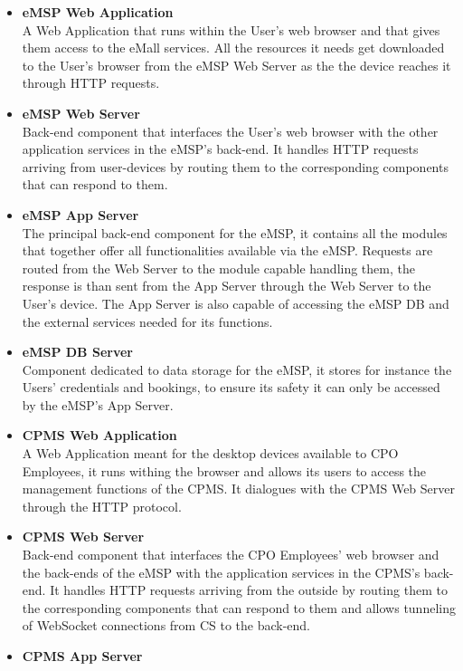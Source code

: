 \documentclass[11pt]{article}
\begin{document}
\begin{itemize}
    \item \textbf{eMSP Web Application} \\
        A Web Application that runs within the User’s web browser and that gives them access to the eMall services. All the resources it needs get downloaded to the User's browser from the eMSP Web Server as the the device reaches it through HTTP requests.

    \newpage

    \item \textbf{eMSP Web Server} \\
        Back-end component that interfaces the User's web browser with the other application services in the eMSP's back-end. It handles HTTP requests arriving from user-devices by routing them to the corresponding components that can respond to them.
    \item \textbf{eMSP App Server} \\
        The principal back-end component for the eMSP, it contains all the modules that together offer all functionalities available via the eMSP. Requests are routed from the Web Server to the module capable handling them, the response is than sent from the App Server through the Web Server to the User's device. The App Server is also capable of accessing the eMSP DB and the external services needed for its functions.
    \item \textbf{eMSP DB Server} \\
        Component dedicated to data storage for the eMSP, it stores for instance the Users' credentials and bookings, to ensure its safety it can only be accessed by the eMSP's App Server.
    \item \textbf{CPMS Web Application} \\
        A Web Application meant for the desktop devices available to CPO Employees, it runs withing the browser and allows its users to access the management functions of the CPMS. It dialogues with the CPMS Web Server through the HTTP protocol.
    \item \textbf{CPMS Web Server} \\
        Back-end component that interfaces the CPO Employees' web browser and the back-ends of the eMSP with the application services in the CPMS's back-end. It handles HTTP requests arriving from the outside by routing them to the corresponding components that can respond to them and allows tunneling of WebSocket connections from CS to the back-end.
    \item \textbf{CPMS App Server} \\

\end{itemize}
\end{document}
